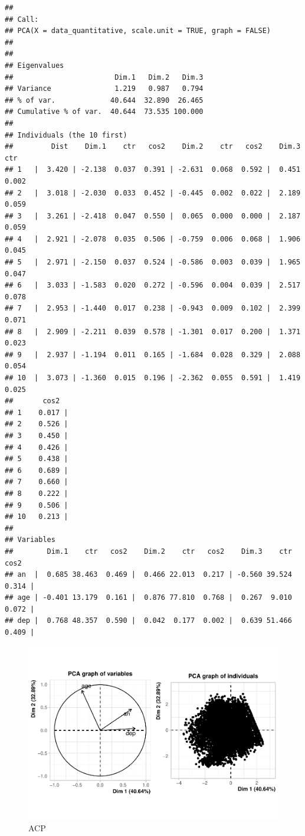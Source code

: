 \documentclass[french,]{compterendu}
\theoremstyle{urcastyle}
\theoremstyle{remark}
\begin{document}
\begin{verbatim}
## 
## Call:
## PCA(X = data_quantitative, scale.unit = TRUE, graph = FALSE) 
## 
## 
## Eigenvalues
##                        Dim.1   Dim.2   Dim.3
## Variance               1.219   0.987   0.794
## % of var.             40.644  32.890  26.465
## Cumulative % of var.  40.644  73.535 100.000
## 
## Individuals (the 10 first)
##         Dist    Dim.1    ctr   cos2    Dim.2    ctr   cos2    Dim.3    ctr
## 1   |  3.420 | -2.138  0.037  0.391 | -2.631  0.068  0.592 |  0.451  0.002
## 2   |  3.018 | -2.030  0.033  0.452 | -0.445  0.002  0.022 |  2.189  0.059
## 3   |  3.261 | -2.418  0.047  0.550 |  0.065  0.000  0.000 |  2.187  0.059
## 4   |  2.921 | -2.078  0.035  0.506 | -0.759  0.006  0.068 |  1.906  0.045
## 5   |  2.971 | -2.150  0.037  0.524 | -0.586  0.003  0.039 |  1.965  0.047
## 6   |  3.033 | -1.583  0.020  0.272 | -0.596  0.004  0.039 |  2.517  0.078
## 7   |  2.953 | -1.440  0.017  0.238 | -0.943  0.009  0.102 |  2.399  0.071
## 8   |  2.909 | -2.211  0.039  0.578 | -1.301  0.017  0.200 |  1.371  0.023
## 9   |  2.937 | -1.194  0.011  0.165 | -1.684  0.028  0.329 |  2.088  0.054
## 10  |  3.073 | -1.360  0.015  0.196 | -2.362  0.055  0.591 |  1.419  0.025
##       cos2  
## 1    0.017 |
## 2    0.526 |
## 3    0.450 |
## 4    0.426 |
## 5    0.438 |
## 6    0.689 |
## 7    0.660 |
## 8    0.222 |
## 9    0.506 |
## 10   0.213 |
## 
## Variables
##        Dim.1    ctr   cos2    Dim.2    ctr   cos2    Dim.3    ctr   cos2  
## an  |  0.685 38.463  0.469 |  0.466 22.013  0.217 | -0.560 39.524  0.314 |
## age | -0.401 13.179  0.161 |  0.876 77.810  0.768 |  0.267  9.010  0.072 |
## dep |  0.768 48.357  0.590 |  0.042  0.177  0.002 |  0.639 51.466  0.409 |
\end{verbatim}

\begin{figure}[H]

{\centering \includegraphics[width=0.9\linewidth]{Rapport_ADD_LEO-GABET_files/figure-latex/acp-1} 

}

\caption{ACP}\label{fig:acp}
\end{figure}
\end{document}
